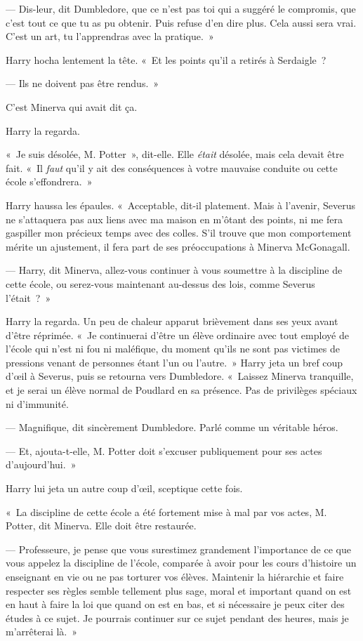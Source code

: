 --- Dis-leur, dit Dumbledore, que ce n'est pas toi qui a suggéré le compromis, que c'est tout ce que tu as pu obtenir.
Puis refuse d'en dire plus.
Cela aussi sera vrai.
C'est un art, tu l'apprendras avec la pratique.~»

Harry hocha lentement la tête.
«~Et les points qu'il a retirés à Serdaigle~?

--- Ils ne doivent pas être rendus.~»

C'est Minerva qui avait dit ça.

Harry la regarda.

«~Je suis désolée, M. Potter~», dit-elle.
Elle \emph{était} désolée, mais cela devait être fait.
«~Il \emph{faut} qu'il y ait des conséquences à votre mauvaise conduite ou cette école s'effondrera.~»

Harry haussa les épaules.
«~Acceptable, dit-il platement.
Mais à l'avenir, Severus ne s'attaquera pas aux liens avec ma maison en m'ôtant des points, ni me fera gaspiller mon précieux temps avec des colles.
S'il trouve que mon comportement mérite un ajustement, il fera part de ses préoccupations à Minerva McGonagall.

--- Harry, dit Minerva, allez-vous continuer à vous soumettre à la discipline de cette école, ou serez-vous maintenant au-dessus des lois, comme Severus l'était~?~»

Harry la regarda.
Un peu de chaleur apparut brièvement dans ses yeux avant d'être réprimée.
«~Je continuerai d'être un élève ordinaire avec tout employé de l'école qui n'est ni fou ni maléfique, du moment qu'ils ne sont pas victimes de pressions venant de personnes étant l'un ou l'autre.~»
Harry jeta un bref coup d'œil à Severus, puis se retourna vers Dumbledore.
«~Laissez Minerva tranquille, et je serai un élève normal de Poudlard en sa présence.
Pas de privilèges spéciaux ni d'immunité.

--- Magnifique, dit sincèrement Dumbledore.
Parlé comme un véritable héros.

--- Et, ajouta-t-elle, M. Potter doit s'excuser publiquement pour ses actes d'aujourd'hui.~»

Harry lui jeta un autre coup d'œil, sceptique cette fois.

«~La discipline de cette école a été fortement mise à mal par vos actes, M. Potter, dit Minerva.
Elle doit être restaurée.

--- Professeure, je pense que vous surestimez grandement l'importance de ce que vous appelez la discipline de l'école, comparée à avoir pour les cours d'histoire un enseignant en vie ou ne pas torturer vos élèves.
Maintenir la hiérarchie et faire respecter ses règles semble tellement plus sage, moral et important quand on est en haut à faire la loi que quand on est en bas, et si nécessaire je peux citer des études à ce sujet.
Je pourrais continuer sur ce sujet pendant des heures, mais je m'arrêterai là.~»

